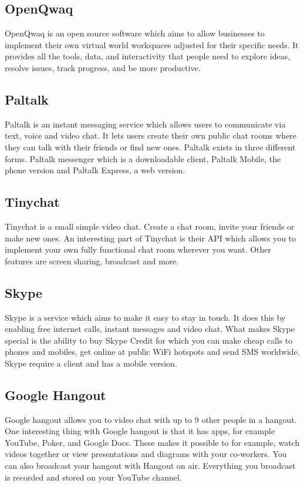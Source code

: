 \documentclass[12pt, titlepage]{article}
\begin{document}
\subsection{OpenQwaq}
OpenQwaq\cite{15} is an open source software which aims to allow businesses to implement their own virtual world workspaces adjusted for their specific needs. It provides all the tools, data, and interactivity that people need to explore ideas, resolve issues, track progress, and be more productive.
\subsection{Paltalk}
Paltalk\cite{16} is an instant messaging service which allows users to communicate via text, voice and video chat. It lets users create their own public chat rooms where they can talk with their friends or find new ones. Paltalk exists in three different forms. Paltalk messenger which is a downloadable client, Paltalk Mobile, the phone version and Paltalk Express, a web version.
\subsection{Tinychat}
Tinychat\cite{17} is a small simple video chat. Create a chat room, invite your friends or make new ones. An interesting part of Tinychat is their API which allows you to implement your own fully functional chat room wherever you want. Other features are screen sharing, broadcast and more.
\subsection{Skype}
Skype\cite{3} is a service which aims to make it easy to stay in touch. It does this by enabling free internet calls, instant messages and video chat. What makes Skype special is the ability to buy Skype Credit for which you can make cheap calls to phones and mobiles, get online at public WiFi hotspots and send SMS worldwide. Skype require a client and has a mobile version.
\subsection{Google Hangout}
Google hangout\cite{2} allows you to video chat with up to 9 other people in a hangout. One interesting thing with Google hangout is that it has apps, for example YouTube, Poker, and Google Docs. These makes it possible to for example, watch videos together or view presentations and diagrams with your co-workers. You can also broadcast your hangout with Hangout on air. Everything you broadcast is recorded and stored on your YouTube channel.
\end{document}

